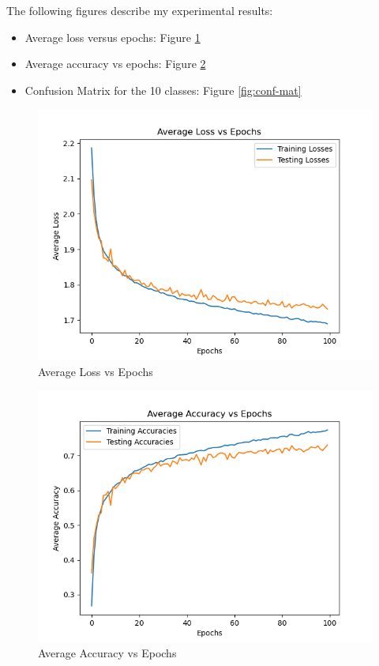 \documentclass{article}
\begin{document}
The following figures describe my experimental results:
\begin{itemize}
    \item Average loss versus epochs: Figure \ref{fig:loss_vs_epochs}
    \item Average accuracy vs epochs: Figure \ref{fig:accuracy_vs_epochs}
    \item Confusion Matrix for the 10 classes: Figure \ref{fig:conf-mat}
\end{itemize}


\begin{figure}[]
    \centering
    \includegraphics[width=5in]{plots_final/Average_Loss_vs_Epochs_plot.png}
    \caption{Average Loss vs Epochs}
    \label{fig:loss_vs_epochs}
\end{figure}

\begin{figure}[]
    \centering
    \includegraphics[width=5in]{plots_final/Average_Accuracy_vs_Epochs_plot.png}
    \caption{Average Accuracy vs Epochs}
    \label{fig:accuracy_vs_epochs}
\end{figure}
\end{document}
